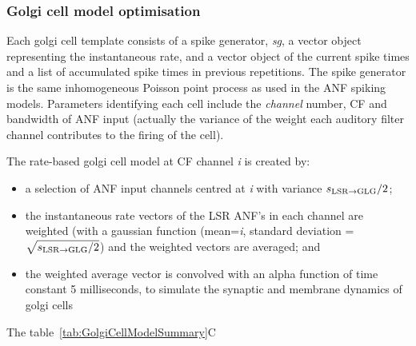 \subsubsection[Golgi model]{Golgi cell model
  optimisation    \label{sec:APDX:golgi-cell-model}}

Each golgi cell template consists of a spike generator, \emph{sg}, a vector object representing the instantaneous rate, and a vector object of the current spike times and a list of accumulated spike times in previous repetitions.
The spike generator is the same inhomogeneous Poisson point process as used in the ANF spiking models.
Parameters identifying each cell include the \emph{channel} number, CF and bandwidth of ANF input (actually the variance of the weight each auditory filter channel contributes to the firing of the cell).

The rate-based golgi cell model at CF channel \emph{i} is created by:
\begin{itemize}
\item a selection of ANF input channels centred at \emph{i} with variance $\protect s_{\protect\textrm{{LSR}}\to\textrm{{GLG}}}/2$;
\item the instantaneous rate vectors of the LSR ANF's in each channel are weighted (with a gaussian function (mean=\emph{i}, standard deviation = $\sqrt{\protect s_{\protect\textrm{{LSR}}\to\textrm{{GLG}}}/2}$) and the weighted vectors are averaged; and
\item the weighted average vector is convolved with an alpha function of time constant 5 milliseconds, to simulate the synaptic and membrane dynamics of golgi cells
\end{itemize}
\noindent The table~\ref{tab:GolgiCellModelSummary}C




